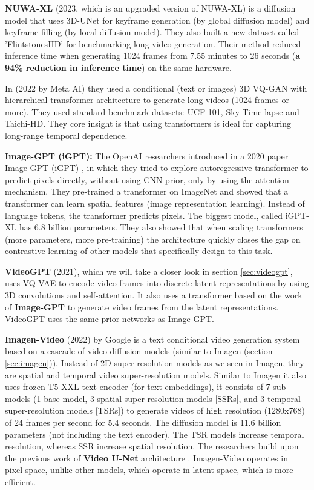 \textbf{NUWA-XL} \cite{nuwa_xl} (2023, which is an upgraded version of NUWA-XL) is a diffusion model that uses 3D-UNet for keyframe generation (by global diffusion model) and keyframe filling (by local diffusion model). They also built a new dataset called 'FlintstonesHD' for benchmarking long video generation. Their method reduced inference time when generating 1024 frames from 7.55 minutes to 26 seconds (\textbf{a 94\% reduction in inference time}) on the same hardware.

In \cite{ge2022long} (2022 by Meta AI) they used a conditional (text or images) 3D VQ-GAN with hierarchical transformer architecture to generate long videos (1024 frames or more). They used standard benchmark datasets: UCF-101, Sky Time-lapse and Taichi-HD. They core insight is that using transformers is ideal for capturing long-range temporal dependence.

\textbf{Image-GPT (iGPT):} The OpenAI researchers introduced in a 2020 paper Image-GPT (iGPT) \cite{imagegpt}, in which they tried to explore autoregressive transformer to predict pixels directly, without using CNN prior, only by using the attention mechanism. They pre-trained a transformer on ImageNet and showed that a transformer can learn spatial features (image representation learning). Instead of language tokens, the transformer predicts pixels. The biggest model, called iGPT-XL has 6.8 billion parameters. They also showed that when scaling transformers (more parameters, more pre-training) the architecture quickly closes the gap on contrastive learning of other models that specifically design to this task.

\textbf{VideoGPT} \cite{videogpt} (2021), which we will take a closer look in section \ref{sec:videogpt}, uses VQ-VAE to encode video frames into discrete latent representations by using 3D convolutions and self-attention. It also uses a transformer based on the work of \textbf{Image-GPT} \cite{imagegpt} to generate video frames from the latent representations. VideoGPT uses the same prior networks as Image-GPT.

\textbf{Imagen-Video} \cite{imagen_video} (2022) by Google is a text conditional video generation system based on a cascade of video diffusion models (similar to Imagen (section \ref{sec:imagen})). Instead of 2D super-resolution models as we seen in Imagen, they are spatial and temporal video super-resolution models. Similar to Imagen it also uses frozen T5-XXL \cite{t5_model} text encoder (for text embeddings), it consists of 7 sub-models (1 base model, 3 spatial super-resolution models [SSRs], and 3 temporal super-resolution models [TSRs]) to generate videos of high resolution (1280x768) of 24 frames per second for 5.4 seconds. The diffusion model is 11.6 billion parameters (not including the text encoder). The TSR models increase temporal resolution, whereas SSR increase spatial resolution. The researchers build upon the previous work of \textbf{Video U-Net} architecture \cite{video_diffusion_models}. Imagen-Video operates in pixel-space, unlike other models, which operate in latent space, which is more efficient.

